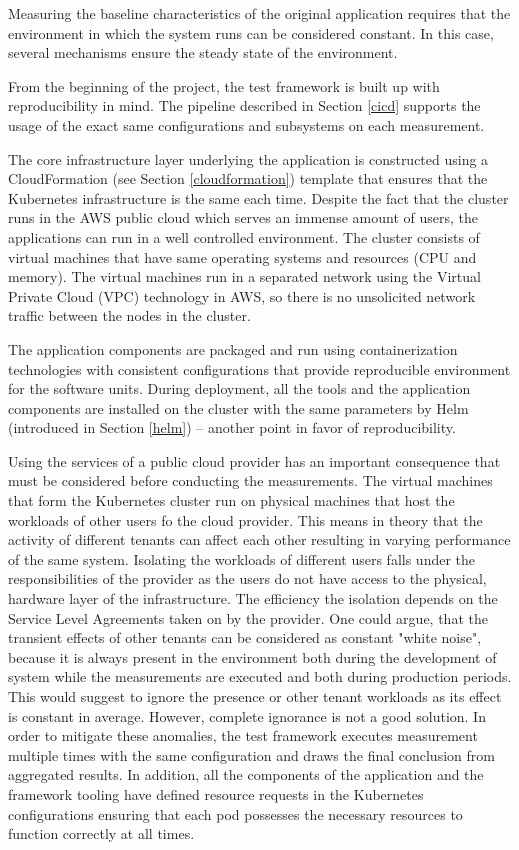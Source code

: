 Measuring the baseline characteristics of the original application requires that the environment in which the system runs can be considered constant. In this case, several mechanisms ensure the steady state of the environment.

From the beginning of the project, the test framework is built up with reproducibility in mind. The pipeline described in Section \ref{cicd} supports the usage of the exact same configurations and subsystems on each measurement. 

The core infrastructure layer underlying the application is constructed using a CloudFormation (see Section \ref{cloudformation}) template that ensures that the Kubernetes infrastructure is the same each time. Despite the fact that the cluster runs in the AWS public cloud which serves an immense amount of users, the applications can run in a well controlled environment. The cluster consists of virtual machines that have same operating systems and resources (\eg CPU and memory). The virtual machines run in a separated network using the Virtual Private Cloud (VPC) technology in AWS, so there is no unsolicited network traffic between the nodes in the cluster.

The application components are packaged and run using containerization technologies with consistent configurations that provide reproducible environment for the software units. During deployment, all the tools and the application components are installed on the cluster with the same parameters by Helm (introduced in Section \ref{helm}) -- another point in favor of reproducibility.

Using the services of a public cloud provider has an important consequence that must be considered before conducting the measurements. The virtual machines that form the Kubernetes cluster run on physical machines that host the workloads of other users fo the cloud provider. This means in theory that the activity of different tenants can affect each other resulting in varying performance of the same system. Isolating the workloads of different users falls under the responsibilities of the provider as the users do not have access to the physical, hardware layer of the infrastructure. The efficiency the isolation depends on the Service Level Agreements taken on by the provider. One could argue, that the transient effects of other tenants can be considered as constant "white noise", because it is always present in the environment both during the development of system while the measurements are executed and both during production periods. This would suggest to ignore the presence or other tenant workloads as its effect is constant in average. However, complete ignorance is not a good solution. In order to mitigate these anomalies, the test framework executes measurement multiple times with the same configuration and draws the final conclusion from aggregated results. In addition, all the components of the application and the framework tooling have defined resource requests \cite{KubernetesResourceManagement} in the Kubernetes configurations ensuring that each pod possesses the necessary resources to function correctly at all times.

